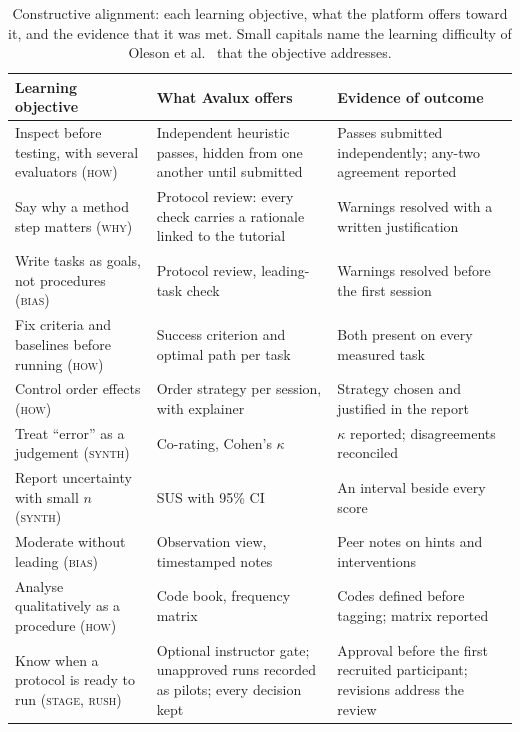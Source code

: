 \documentclass[conference]{IEEEtran}
\begin{document}
\begin{table}[t]
\caption{Constructive alignment: each learning objective, what the
platform offers toward it, and the evidence that it was met. Small capitals
name the learning difficulty of Oleson et al.~\cite{oleson2020difficulties}
that the objective addresses.}
\label{tab:pedagogy}
\centering
\footnotesize
\setlength{\tabcolsep}{4pt}
\begin{tabular}{@{}>{\raggedright\arraybackslash}p{}>{\raggedright\arraybackslash}p{}>{\raggedright\arraybackslash}p{}@{}}
\toprule
Learning objective & What Avalux offers & Evidence of outcome \\
\midrule
Inspect before testing, with several evaluators (\textsc{how}) & Independent heuristic passes, hidden from one another until submitted & Passes submitted independently; any-two agreement reported \\
Say why a method step matters (\textsc{why}) & Protocol review: every check carries a rationale linked to the tutorial & Warnings resolved with a written justification \\
Write tasks as goals, not procedures (\textsc{bias}) & Protocol review, leading-task check & Warnings resolved before the first session \\
Fix criteria and baselines before running (\textsc{how}) & Success criterion and optimal path per task & Both present on every measured task \\
Control order effects (\textsc{how}) & Order strategy per session, with explainer & Strategy chosen and justified in the report \\
Treat ``error'' as a judgement (\textsc{synth}) & Co-rating, Cohen's $\kappa$ & $\kappa$ reported; disagreements reconciled \\
Report uncertainty with small $n$ (\textsc{synth}) & SUS with 95\% CI & An interval beside every score \\
Moderate without leading (\textsc{bias}) & Observation view, timestamped notes & Peer notes on hints and interventions \\
Analyse qualitatively as a procedure (\textsc{how}) & Code book, frequency matrix & Codes defined before tagging; matrix reported \\
Know when a protocol is ready to run (\textsc{stage}, \textsc{rush}) & Optional instructor gate; unapproved runs recorded as pilots; every decision kept & Approval before the first recruited participant; revisions address the review \\

\end{tabular}
\end{table}
\end{document}
